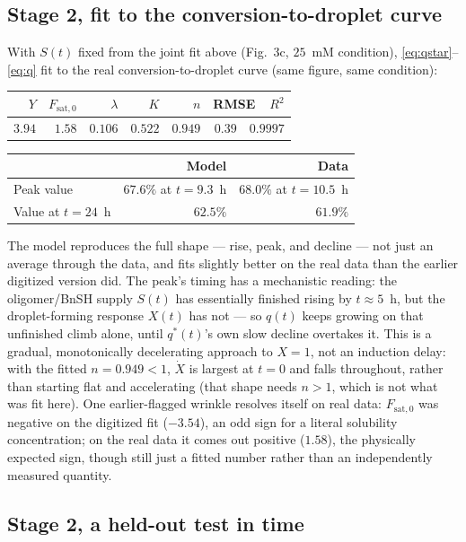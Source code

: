 \documentclass[11pt]{article}
\begin{document}
\subsection{Stage 2, fit to the conversion-to-droplet curve}
\label{sec:droplet-fit}

With $S(t)$ fixed from the joint fit above (Fig.~3c, $25$~mM condition), \eqref{eq:qstar}--%
\eqref{eq:q} fit to the real conversion-to-droplet curve (same figure, same condition):
\begin{center}
\begin{tabular}{rrrrrr}
\toprule
$Y$ & $F_{\mathrm{sat},0}$ & $\lambda$ & $K$ & $n$ & RMSE\ \ $R^2$\\
\midrule
$3.94$ & $1.58$ & $0.106$ & $0.522$ & $0.949$ & $0.39$\ \ $0.9997$\\
\bottomrule
\end{tabular}
\end{center}
\begin{center}
\begin{tabular}{lrr}
\toprule
& Model & Data\\
\midrule
Peak value & $67.6\%$ at $t=9.3$~h & $68.0\%$ at $t=10.5$~h\\
Value at $t=24$~h & $62.5\%$ & $61.9\%$\\
\bottomrule
\end{tabular}
\end{center}
The model reproduces the full shape --- rise, peak, and decline --- not just an average
through the data, and fits slightly better on the real data than the earlier digitized version
did. The peak's timing has a mechanistic reading: the oligomer/BnSH supply
$S(t)$ has essentially finished rising by $t\approx5$~h, but the droplet-forming response
$X(t)$ has not --- so
$q(t)$ keeps growing on that unfinished climb alone, until $q^*(t)$'s own slow decline
overtakes it. This is a gradual, monotonically decelerating approach to $X=1$, not an
induction delay: with the fitted $n=0.949<1$, $\dot X$ is largest at $t=0$ and falls
throughout, rather than starting flat and accelerating (that shape needs $n>1$, which is not
what was fit here). One earlier-flagged wrinkle resolves itself on real data:
$F_{\mathrm{sat},0}$ was negative on the digitized fit ($-3.54$), an odd sign for a literal
solubility concentration; on the real data it comes out positive ($1.58$), the physically
expected sign, though still just a fitted number rather than an independently measured
quantity.

\subsection{Stage 2, a held-out test in time}
\label{sec:droplet-held-out}
\end{document}

